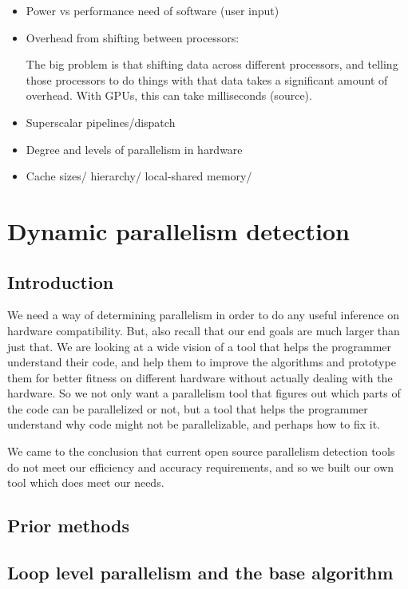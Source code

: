 \documentclass[12pt,twoside]{reedthesis}
\begin{document}
	\begin{itemize}
		\item Power vs performance need of software (user input)

		\item Overhead from shifting between processors:

		The big problem is that shifting data across different processors, and telling those processors to do things with that data takes a significant amount of overhead. With GPUs, this can take milliseconds (source).

		\item Superscalar pipelines/dispatch

		\item Degree and levels of parallelism in hardware

		\item Cache sizes/ hierarchy/ local-shared memory/

	\end{itemize}

\chapter{Dynamic parallelism detection}

	\section{Introduction}
		We need a way of determining parallelism in order to do any useful inference on hardware compatibility. But, also recall that our end goals are much larger than just that. We are looking at a wide vision of a tool that helps the programmer understand their code, and help them to improve the algorithms and prototype them for better fitness on different hardware without actually dealing with the hardware. So we not only want a parallelism tool that figures out which parts of the code can be parallelized or not, but a tool that helps the programmer understand why code might not be parallelizable, and perhaps how to fix it. 
		 
		We came to the conclusion that current open source parallelism detection tools do not meet our efficiency and accuracy requirements, and so we built our own tool which does meet our needs. 
		
	\section{Prior methods}
	\section{Loop level parallelism and the base algorithm}
	
\end{document}
